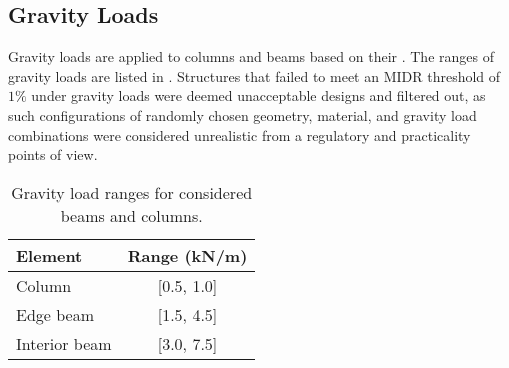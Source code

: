\subsection{Gravity Loads}
Gravity loads are applied to columns and beams based on their . The ranges of gravity loads are listed in .  Structures that failed to meet an MIDR threshold of $1\%$ under gravity loads were deemed unacceptable designs and filtered out, as such configurations of randomly chosen geometry, material, and gravity load combinations were considered unrealistic from a regulatory and practicality points of view.
\begin{table}[h!]
    \centering
    \caption{Gravity load ranges for considered beams and columns.}
    \begin{tabular}{lc}
        \toprule
        Element & Range (kN/m)  \\
        \midrule
        Column & [0.5, 1.0]  \\
        Edge beam & [1.5, 4.5]  \\
        Interior beam & [3.0, 7.5]  \\
        \bottomrule
    \end{tabular}
    \label{tab:gravity_load_ranges}
\end{table} 

